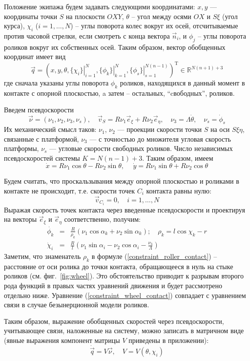 Положение экипажа будем задавать следующими координатами:
$x, y$ --- координаты точки $S$ на плоскости $OXY$, $\theta$ -- угол между осями $OX$ и $S\xi$ (угол курса),
$\chi_i$ ($i = 1,\dots,N$) -- углы поворота колес вокруг их осей, отсчитываемые против часовой стрелки, если смотреть с конца вектора $\vec{n}_i$, и $\phi_j$ -- углы поворота роликов вокруг их собственных осей.
Таким образом, вектор обобщенных координат имеет вид
$$\vec{q} = (
    x, y, \theta,
    \left.\{\chi_i\}\right|_{i=1}^N ,
    \left.\{\phi_k\}\right|_{k=1}^N,
    \left.\{\phi_s\}\right|_{s=1}^{N(n - 1)}
)^{\mathop{T}}\in\mathbb{R}^{N(n+1) + 3}$$ 
где сначала указаны углы поворота $\phi_k$ роликов, находящихся в данный момент в контакте с опорной плоскостью, a затем -- остальных, ``cвободных'', роликов.

Введем псевдоскорости
$$\vec{\nu} = (\nu_1, \nu_2, \nu_3, \nu_s), \quad \vec{v}_S = R\nu_1\vec{e}_\xi + R\nu_2\vec{e}_\eta, \quad \nu_3 = \Lambda\dot{\theta},\quad \nu_s = \dot{\phi}_s$$
Их механический смысл таков: $\nu_1$, $\nu_2$ --- проекции скорости точки $S$ на оси $S\xi\eta$, связанные с платформой, $\nu_3$ --- с точностью до множителя угловая скорость платформы, $\nu_s$ --- угловые скорости свободных роликов. Число независимых псевдоскоростей системы $K = N(n-1)+3$. Таким образом, имеем
$$ \dot{x} = R \nu_1\cos\theta-R\nu_2\sin\theta, \hspace{15pt} \dot{y} = R\nu_1\sin\theta+R\nu_2\cos\theta$$

Будем считать, что проскальзывания между опорной плоскостью и роликами в контакте не происходит, т.е.
скорости точек $C_i$ контакта равны нулю:
$$\vec{v}_{C_i} = 0,\quad i = 1,\dots, N$$
Выражая скорость точек контакта через введенные псевдоскорости и проектируя на векторы $\vec{e}_\xi$ и $\vec{e}_\eta$ соответственно, получим:
\begin{eqnarray}
\dot{\phi_k} &=& \frac{R}{\rho_k }(\nu_1\cos\alpha_k + \nu_2\sin\alpha_k); \quad \rho_k  = l\cos\chi_k - r \label{constraint_roller_contact}\\
\dot{\chi}_i &=& \frac{R}{l}(\nu_1\sin\alpha_i - \nu_2\cos\alpha_i - \frac{\nu_3}{\Lambda})\label{constraint_wheel_contact}
\end{eqnarray}
Заметим, что знаменатель $\rho_k$ в формуле (\ref{constraint_roller_contact}) -- расстояние от оси ролика до точки контакта, обращающееся в нуль на стыке роликов (см. фиг.~\ref{fig:wheel}). Это обстоятельство приводит к разрывам второго рода функций в правых частях уравнений движения и будет рассмотрено отдельно ниже.
Уравнение (\ref{constraint_wheel_contact}) совпадает с уравнением связи в случае безынерционной модели роликов. 

Таким образом, выражение обобщенных скоростей через псевдоскорости, учитывающее связи, наложенные на систему, можно записать в матричном виде (явные выражения компонент матрицы $V$ приведены в приложении):
\begin{equation}\label{constraints_V}
    \dot{\vec{q}} = V\vec{\nu},\quad V = V(\theta,\chi_i)
\end{equation}
